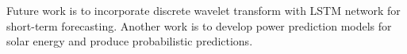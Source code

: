 \documentclass[conference]{IEEEtran}
\begin{document}
Future work is to incorporate discrete wavelet transform with LSTM network for short-term forecasting. Another work is to develop power prediction models for solar energy and produce probabilistic predictions. 




%
%



%
%
\end{document}
